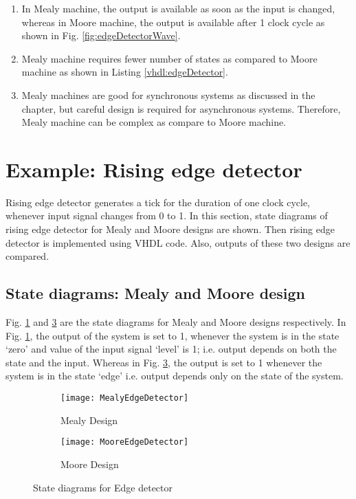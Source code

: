\begin{enumerate}
	\item In Mealy machine, the output is available as soon as the input is changed, whereas in Moore machine, the output is available after 1 clock cycle as shown in Fig. \ref{fig:edgeDetectorWave}.
	
	\item Mealy machine requires fewer number of states as compared to Moore machine as shown in Listing \ref{vhdl:edgeDetector}. 
	
	\item Mealy machines are good for synchronous systems as discussed in the chapter, but careful design is required for asynchronous systems. Therefore, Mealy machine can be complex as compare to Moore machine. 
\end{enumerate}

\section{Example: Rising edge detector} \label{sec:FSMExample}
Rising edge detector generates a tick for the duration of one clock cycle, whenever input signal changes from 0 to 1. In this section, state diagrams of rising edge detector for Mealy and Moore designs are shown. Then rising edge detector is implemented using VHDL code. Also, outputs of these two designs are compared. 

\subsection{State diagrams: Mealy and Moore design}
Fig. \ref{fig:MealyEdgeDetector} and \ref{fig:MooreEdgeDetector} are the state diagrams for Mealy and Moore designs respectively. In Fig. \ref{fig:MealyEdgeDetector}, the output of the system is set to 1, whenever the system is in the state `zero' and value of the input signal `level' is 1; i.e. output depends on both the state and the input. Whereas in Fig. \ref{fig:MooreEdgeDetector}, the output is set to 1 whenever the system is in the state `edge' i.e. output depends only on the state of the system. 

\begin{figure}[h!]
	\centering
	\begin{subfigure}[t]{0.5\textwidth}
		\centering
		\texttt{[image: MealyEdgeDetector]}
		\caption{Mealy Design}
		\label{fig:MealyEdgeDetector}
	\end{subfigure}%
	\begin{subfigure}[t]{0.5\textwidth}
		\centering
		\texttt{[image: MooreEdgeDetector]}
		\caption{Moore Design}
		\label{fig:MooreEdgeDetector}
	\end{subfigure}
	
	\caption{State diagrams for Edge detector }
\end{figure}


